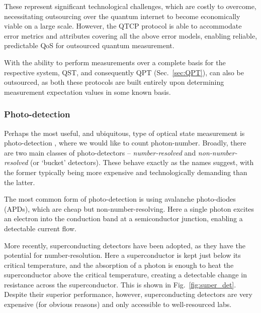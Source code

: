 \documentclass[aps, rmp, twocolumn, amsmath, amssymb, nofootinbib, superscriptaddress, longbibliography, floatfix, table-of-contents, eqsecnum]{revtex4-1}
\begin{document}
These represent significant technological challenges, which are costly to overcome, necessitating outsourcing over the quantum internet to become economically viable on a large scale. However, the QTCP protocol is able to accommodate error metrics and attributes covering all the above error models, enabling reliable, predictable QoS for outsourced quantum measurement.

With the ability to perform measurements over a complete basis for the respective system, QST, and consequently QPT (Sec.~\ref{sec:QPT}), can also be outsourced, as both these protocols are built entirely upon determining measurement expectation values in some known basis.

%
%

\subsubsection{Photo-detection} \label{sec:photo_detection} 

Perhaps the most useful, and ubiquitous, type of optical state measurement is photo-detection \cite{RohdePDReview}, where we would like to count photon-number. Broadly, there are two main classes of photo-detectors -- \textit{number-resolved} and \textit{non-number-resolved} (or `bucket' detectors). These behave exactly as the names suggest, with the former typically being more expensive and technologically demanding than the latter.

The most common form of photo-detection is using avalanche photo-diodes (APDs), which are cheap but non-number-resolving. Here a single photon excites an electron into the conduction band at a semiconductor junction, enabling a detectable current flow.

More recently, superconducting detectors have been adopted, as they have the potential for number-resolution. Here a superconductor is kept just below its critical temperature, and the absorption of a photon is enough to heat the superconductor above the critical temperature, creating a detectable change in resistance across the superconductor. This is shown in Fig.~\ref{fig:super_det}. Despite their superior performance, however, superconducting detectors are very expensive (for obvious reasons) and only accessible to well-resourced labs.
\end{document}
